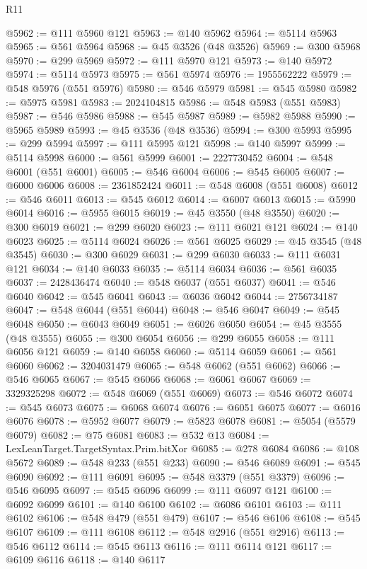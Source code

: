 \begin{lexlean}{R11}
\begin{coremodule}
{{{{{{{{{{{{{{{{{{{{{{{{{{{{{{{{{{{{{{{{{{{{{{{{{{{{{{{{{{{{{{{{{{{{{{{{{{{{{{{{{{@5962 := @111 @5960 @121
@5963 := @140 @5962
@5964 := @5114 @5963
@5965 := @561 @5964
@5968 := @45 @3526 (@48 @3526)
@5969 := @300 @5968
@5970 := @299 @5969
@5972 := @111 @5970 @121
@5973 := @140 @5972
@5974 := @5114 @5973
@5975 := @561 @5974
@5976 := 1955562222
@5979 := @548 @5976 (@551 @5976)
@5980 := @546 @5979
@5981 := @545 @5980
@5982 := @5975 @5981
@5983 := 2024104815
@5986 := @548 @5983 (@551 @5983)
@5987 := @546 @5986
@5988 := @545 @5987
@5989 := @5982 @5988
@5990 := @5965 @5989
@5993 := @45 @3536 (@48 @3536)
@5994 := @300 @5993
@5995 := @299 @5994
@5997 := @111 @5995 @121
@5998 := @140 @5997
@5999 := @5114 @5998
@6000 := @561 @5999
@6001 := 2227730452
@6004 := @548 @6001 (@551 @6001)
@6005 := @546 @6004
@6006 := @545 @6005
@6007 := @6000 @6006
@6008 := 2361852424
@6011 := @548 @6008 (@551 @6008)
@6012 := @546 @6011
@6013 := @545 @6012
@6014 := @6007 @6013
@6015 := @5990 @6014
@6016 := @5955 @6015
@6019 := @45 @3550 (@48 @3550)
@6020 := @300 @6019
@6021 := @299 @6020
@6023 := @111 @6021 @121
@6024 := @140 @6023
@6025 := @5114 @6024
@6026 := @561 @6025
@6029 := @45 @3545 (@48 @3545)
@6030 := @300 @6029
@6031 := @299 @6030
@6033 := @111 @6031 @121
@6034 := @140 @6033
@6035 := @5114 @6034
@6036 := @561 @6035
@6037 := 2428436474
@6040 := @548 @6037 (@551 @6037)
@6041 := @546 @6040
@6042 := @545 @6041
@6043 := @6036 @6042
@6044 := 2756734187
@6047 := @548 @6044 (@551 @6044)
@6048 := @546 @6047
@6049 := @545 @6048
@6050 := @6043 @6049
@6051 := @6026 @6050
@6054 := @45 @3555 (@48 @3555)
@6055 := @300 @6054
@6056 := @299 @6055
@6058 := @111 @6056 @121
@6059 := @140 @6058
@6060 := @5114 @6059
@6061 := @561 @6060
@6062 := 3204031479
@6065 := @548 @6062 (@551 @6062)
@6066 := @546 @6065
@6067 := @545 @6066
@6068 := @6061 @6067
@6069 := 3329325298
@6072 := @548 @6069 (@551 @6069)
@6073 := @546 @6072
@6074 := @545 @6073
@6075 := @6068 @6074
@6076 := @6051 @6075
@6077 := @6016 @6076
@6078 := @5952 @6077
@6079 := @5823 @6078
@6081 := @5054 (@5579 @6079)
@6082 := @75 @6081
@6083 := @532 @13
@6084 := LexLeanTarget.TargetSyntax.Prim.bitXor
@6085 := @278 @6084
@6086 := @108 @5672
@6089 := @548 @233 (@551 @233)
@6090 := @546 @6089
@6091 := @545 @6090
@6092 := @111 @6091
@6095 := @548 @3379 (@551 @3379)
@6096 := @546 @6095
@6097 := @545 @6096
@6099 := @111 @6097 @121
@6100 := @6092 @6099
@6101 := @140 @6100
@6102 := @6086 @6101
@6103 := @111 @6102
@6106 := @548 @479 (@551 @479)
@6107 := @546 @6106
@6108 := @545 @6107
@6109 := @111 @6108
@6112 := @548 @2916 (@551 @2916)
@6113 := @546 @6112
@6114 := @545 @6113
@6116 := @111 @6114 @121
@6117 := @6109 @6116
@6118 := @140 @6117
}}}}}}}}}}}}}}}}}}}}}}}}}}}}}}}}}}}}}}}}}}}}}}}}}}}}}}}}}}}}}}}}}}}}}}}}}}}}}}}}}}
\end{coremodule}
\end{lexlean}
